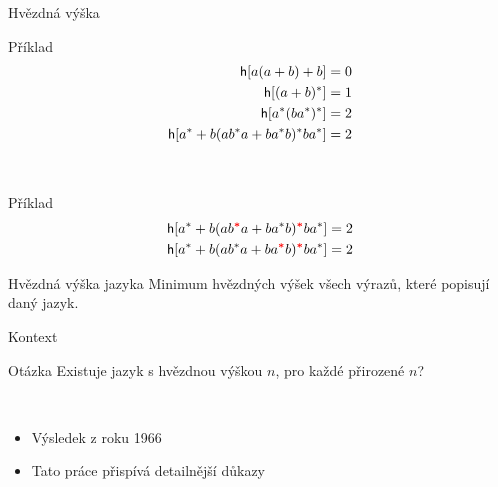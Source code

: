 \documentclass{beamer}
\begin{document}
\begin{frame}{Hvězdná výška}
      \begin{exampleblock}{Příklad}
            \vspace{-5mm}%
            \begin{align*}
                  {\mathsf{h}[a(a+b) + b]} &= 0 \\
                  {\mathsf{h}[(a+b)^*]} &= 1 \\
                  {\mathsf{h}[a^*(ba^*)^*]} &= 2 \\
                  {\mathsf{h}[a^* + b(ab^*a + ba^*b)^*ba^*]} &= 2
            \end{align*}
      \end{exampleblock}

      ~

      {
            \begin{exampleblock}{Příklad}
                  \vspace{-5mm}%
                  \begin{align*}
                        {\mathsf{h}[a^* + b(ab^{\color{red}\boldsymbol{*}}a + ba^*b)^{\color{red}\boldsymbol{*}}ba^*]} &= 2 \\
                        {\mathsf{h}[a^* + b(ab^*a + ba^{\color{red}\boldsymbol{*}}b)^{\color{red}\boldsymbol{*}}ba^*]} &= 2
                  \end{align*}
            \end{exampleblock}
      }
      {
            \begin{block}{Hvězdná výška jazyka}
                  Minimum hvězdných výšek všech výrazů, které popisují daný jazyk.
            \end{block}
      }
\end{frame}

\begin{frame}{Kontext}
      \begin{block}{Otázka}
            Existuje jazyk s hvězdnou výškou $n$, pro každé přirozené $n$?
      \end{block}

      ~

      \begin{itemize}
            \item Výsledek z roku 1966
            \item Tato práce přispívá detailnější důkazy
      \end{itemize}
\end{frame}
\end{document}
